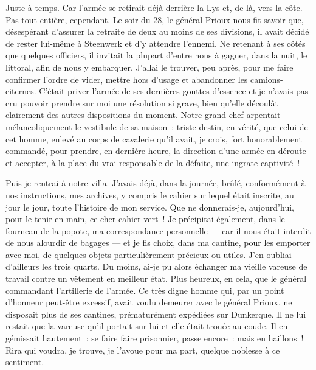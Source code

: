 \documentclass[french,twoside]{book} %
\begin{document}
Juste à temps. Car l’armée se retirait déjà   derrière la Lys et, de là, vers la côte. Pas tout entière, cependant. Le soir du 28, le général Prioux nous fit savoir que, désespérant d’assurer la retraite de deux au moins de ses divisions, il avait décidé de rester lui-même à Steenwerk et d’y attendre l’ennemi. Ne retenant à ses côtés que quelques officiers, il invitait la plupart d’entre nous à gagner, dans la nuit, le littoral, afin de nous y embarquer. J’allai le trouver, peu après, pour me faire confirmer l’ordre de vider, mettre hors d’usage et abandonner les camions-citernes. C’était priver l’armée de ses dernières gouttes d’essence et je n’avais pas cru pouvoir prendre sur moi une résolution si grave, bien qu’elle découlât clairement des autres dispositions du moment. Notre grand chef arpentait mélancoliquement le vestibule de sa maison : triste destin, en vérité, que celui de cet homme, enlevé au corps de cavalerie qu’il avait, je crois, fort honorablement commandé, pour prendre, en dernière heure, la direction d’une armée en déroute et accepter, à la place du vrai responsable de la défaite, une ingrate captivité !\par
Puis je rentrai à notre villa. J’avais déjà, dans la journée, brûlé, conformément à nos instructions, mes archives, y compris le cahier sur lequel était inscrite, au jour le jour, toute l’histoire de mon service. Que ne donnerais-je, aujourd’hui, pour le tenir en main, ce cher cahier vert ! Je précipitai également, dans le fourneau de la popote, ma correspondance personnelle — car il nous était interdit de nous alourdir de bagages — et je fis choix, dans ma cantine, pour les emporter avec moi, de quelques objets particulièrement précieux ou utiles. J’en oubliai d’ailleurs les trois quarts. Du moins, ai-je pu alors échanger ma vieille vareuse de travail contre un vêtement en meilleur état. Plus heureux, en cela, que le général commandant l’artillerie de l’armée. Ce très digne homme qui, par un point d’honneur peut-être excessif, avait voulu demeurer avec le général Prioux,   ne disposait plus de ses cantines, prématurément expédiées sur Dunkerque. Il ne lui restait que la vareuse qu’il portait sur lui et elle était trouée au coude. Il en gémissait hautement : se faire faire prisonnier, passe encore : mais en haillons ! Rira qui voudra, je trouve, je l’avoue pour ma part, quelque noblesse à ce sentiment.\par
\end{document}
